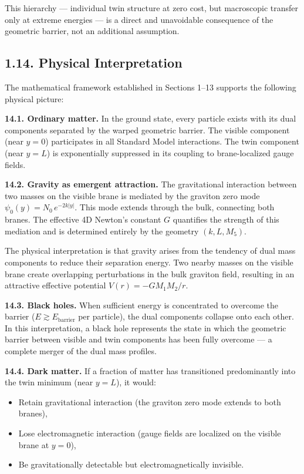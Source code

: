 \documentclass[
  11pt,
]{article}
\providecommand{\tightlist}{%
  \setlength{\itemsep}{0pt}\setlength{\parskip}{0pt}}
\begin{document}
This hierarchy --- individual twin structure at zero cost, but
macroscopic transfer only at extreme energies --- is a direct and
unavoidable consequence of the geometric barrier, not an additional
assumption.

\bigskip

\hypertarget{physical-interpretation}{%
\subsection{1.14. Physical
Interpretation}\label{physical-interpretation}}

The mathematical framework established in Sections 1--13 supports the
following physical picture:

\textbf{14.1. Ordinary matter.} In the ground state, every particle
exists with its dual components separated by the warped geometric
barrier. The visible component (near \(y = 0\)) participates in all
Standard Model interactions. The twin component (near \(y = L\)) is
exponentially suppressed in its coupling to brane-localized gauge
fields.

\textbf{14.2. Gravity as emergent attraction.} The gravitational
interaction between two masses on the visible brane is mediated by the
graviton zero mode \(\psi_0(y) = N_0\,e^{-2k|y|}\). This mode extends
through the bulk, connecting both branes. The effective 4D Newton's
constant \(G\) quantifies the strength of this mediation and is
determined entirely by the geometry \((k, L, M_5)\).

The physical interpretation is that gravity arises from the tendency of
dual mass components to reduce their separation energy. Two nearby
masses on the visible brane create overlapping perturbations in the bulk
graviton field, resulting in an attractive effective potential
\(V(r) = -GM_1 M_2/r\).

\textbf{14.3. Black holes.} When sufficient energy is concentrated to
overcome the barrier (\(E \gtrsim E_{\text{barrier}}\) per particle),
the dual components collapse onto each other. In this interpretation, a
black hole represents the state in which the geometric barrier between
visible and twin components has been fully overcome --- a complete
merger of the dual mass profiles.

\textbf{14.4. Dark matter.} If a fraction of matter has transitioned
predominantly into the twin minimum (near \(y = L\)), it would:

\begin{itemize}
\tightlist
\item
  Retain gravitational interaction (the graviton zero mode extends to
  both branes),
\item
  Lose electromagnetic interaction (gauge fields are localized on the
  visible brane at \(y = 0\)),
\item
  Be gravitationally detectable but electromagnetically invisible.
\end{itemize}
\end{document}
